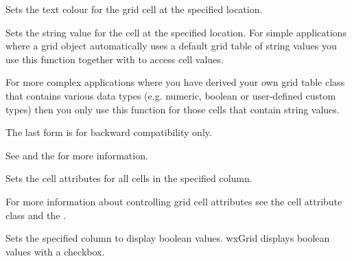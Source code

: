 
Sets the text colour for the grid cell at the specified location.



\label{wxgridsetcellvalue}




Sets the string value for the cell at the specified location. For simple applications where a
grid object automatically uses a default grid table of string values you use this function together
with  to access cell values.

For more complex applications where you have derived your own grid table class that contains
various data types (e.g. numeric, boolean or user-defined custom types) then you only use this
function for those cells that contain string values.

The last form is for backward compatibility only.

See 
and the  for more information.



\label{wxgridsetcolattr}


Sets the cell attributes for all cells in the specified column.

For more information about controlling grid cell attributes see the
 cell attribute class and the
.



\label{wxgridsetcolformatbool}


Sets the specified column to display boolean values. wxGrid displays boolean values with a checkbox.



